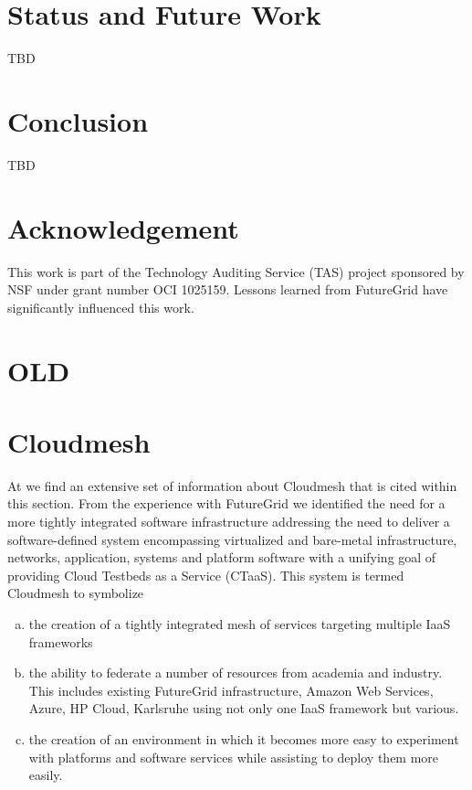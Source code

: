 \documentclass{tex/sig-alternate}
\begin{document}
\section{Status and Future Work}

TBD

\section{Conclusion}

TBD
 
 
\section*{Acknowledgement} 
 
This work is part of the Technology Auditing Service (TAS) project sponsored by NSF under grant number OCI 1025159. Lessons learned from FutureGrid have significantly influenced this work. 

\section{OLD}


\section{Cloudmesh}\label{S:cloudmesh}


At \cite{github-cloudmesh} we find an extensive set of information about Cloudmesh that is cited within this section. 
From the experience with FutureGrid we identified the need for a more tightly integrated software infrastructure addressing the need to deliver a software-defined system encompassing virtualized and bare-metal infrastructure, networks, application, systems and platform software with a unifying goal of providing Cloud Testbeds as a Service (CTaaS). This system is termed Cloudmesh to symbolize 


\begin{enumerate}[(a)]


\item the creation of a tightly integrated mesh of services targeting multiple IaaS frameworks 


\item the ability to federate a number of resources from academia and industry. This includes existing FutureGrid infrastructure, Amazon Web Services, Azure, HP Cloud, Karlsruhe using not only one IaaS framework but various. 


\item the creation of an environment in which it becomes more easy to experiment with platforms and software services while assisting to deploy them more easily.  


\end{enumerate}
\end{document}
